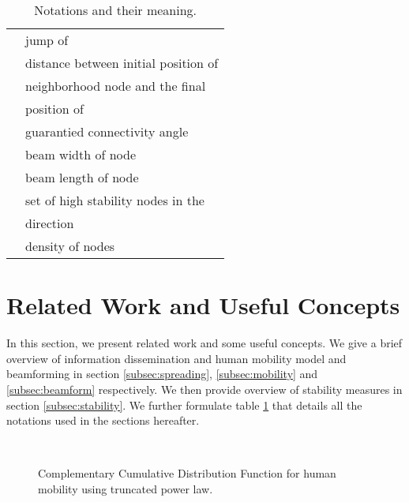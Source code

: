 \documentclass[preprint, twocolumn,5p]{elsarticle}
\begin{document}
\begin{table}[!htb]
\begin{tabular}{|l|l|}
         & jump of \\
         & distance between initial position of\\
                & neighborhood node and the final \\
                & position of \\
         & guarantied connectivity angle \\
         & beam width of node \\
         & beam length of node \\
        & set of high stability nodes in the \\
                     &direction \\
         & density of nodes\\
        \hline
    \end{tabular}
    \caption{Notations and their meaning.}
    \label{table:N_M}
\end{table}


\section{Related Work and Useful Concepts}\label{sec:relatedwork}
    In this section, we present related work and some useful concepts. We give a brief overview of information dissemination and human mobility model and beamforming in section \ref{subsec:spreading}, \ref{subsec:mobility} and \ref{subsec:beamform} respectively. We then provide overview of stability measures in section \ref{subsec:stability}. We further formulate table \ref{table:N_M} that details all the notations used in the sections hereafter.

    \begin{figure*}
        \centering
        \mbox
        {
        }
        \caption{Complementary Cumulative Distribution Function for human mobility using truncated power law.}
        \label{fig:pdf_human_mobility}
    \end{figure*}
\end{document}
